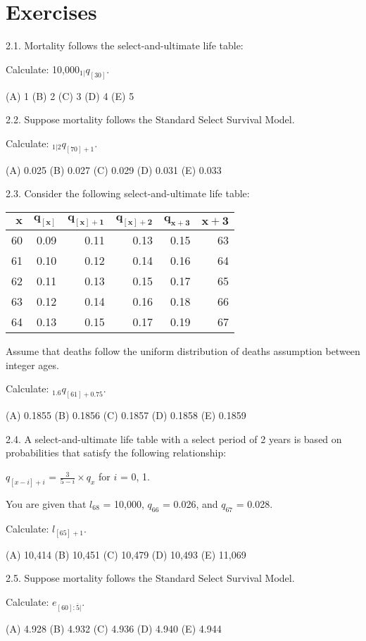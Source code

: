 \documentclass[]{book}
\begin{document}
\section{Exercises}\label{exercises-1}

2.1. Mortality follows the select-and-ultimate life table:

Calculate: 10,000\({}_{1|}q_{[30]}\).

(A) 1 (B) 2 (C) 3 (D) 4 (E) 5

2.2. Suppose mortality follows the Standard Select Survival Model.

Calculate: \({}_{1|2}q_{[70]+1}\).

(A) 0.025 (B) 0.027 (C) 0.029 (D) 0.031 (E) 0.033

2.3. Consider the following select-and-ultimate life table:

\begin{longtable}[]{@{}rrrrrr@{}}
\toprule
\(\mathbf{x}\) & \(\mathbf{q_{[x]}}\) & \(\mathbf{q_{[x] + 1}}\) &
\(\mathbf{q_{[x] + 2}}\) & \(\mathbf{q_{x + 3}}\) &
\(\mathbf{x + 3}\)\tabularnewline
\midrule
\endhead
60 & 0.09 & 0.11 & 0.13 & 0.15 & 63\tabularnewline
61 & 0.10 & 0.12 & 0.14 & 0.16 & 64\tabularnewline
62 & 0.11 & 0.13 & 0.15 & 0.17 & 65\tabularnewline
63 & 0.12 & 0.14 & 0.16 & 0.18 & 66\tabularnewline
64 & 0.13 & 0.15 & 0.17 & 0.19 & 67\tabularnewline
\bottomrule
\end{longtable}

Assume that deaths follow the uniform distribution of deaths assumption
between integer ages.

Calculate: \({}_{1.6}q_{[61] + 0.75}\).

(A) 0.1855 (B) 0.1856 (C) 0.1857 (D) 0.1858 (E) 0.1859

2.4. A select-and-ultimate life table with a select period of 2 years is
based on probabilities that satisfy the following relationship:

\(q_{[x - i] + i}\) = \(\frac{3}{5 - i} \times q_x\) for \(i\) = 0, 1.

You are given that \(l_{68}\) = 10,000, \(q_{66}\) = 0.026, and
\(q_{67}\) = 0.028.

Calculate: \(l_{[65] + 1}\).

(A) 10,414 (B) 10,451 (C) 10,479 (D) 10,493 (E) 11,069

2.5. Suppose mortality follows the Standard Select Survival Model.

Calculate: \(e_{[60] :\overline{5}|}\).

(A) 4.928 (B) 4.932 (C) 4.936 (D) 4.940 (E) 4.944
\end{document}
